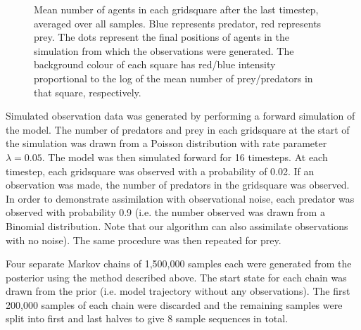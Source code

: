\documentclass{article}
\begin{document}
\begin{figure}
	\centering
	\caption{Mean number of agents in each gridsquare after the last timestep, averaged over all samples. Blue represents predator, red represents prey. The dots represent the final positions of agents in the simulation from which the observations were generated. The background colour of each square has red/blue intensity proportional to the log of the mean number of prey/predators in that square, respectively.}
	\label{figEndState}
\end{figure}


Simulated observation data was generated by performing a forward simulation of the model. The number of predators and prey in each gridsquare at the start of the simulation was drawn from a Poisson distribution with rate parameter $\lambda = 0.05$. The model was then simulated forward for 16 timesteps. At each timestep, each gridsquare was observed with a probability of 0.02. If an observation was made, the number of predators in the gridsquare was observed. In order to demonstrate assimilation with observational noise, each predator was observed with probability 0.9 (i.e. the number observed was drawn from a Binomial distribution. Note that our algorithm can also assimilate observations with no noise). The same procedure was then repeated for prey.

Four separate Markov chains of 1,500,000 samples each were generated from the posterior using the method described above. The start state for each chain was drawn from the prior (i.e. model trajectory without any observations). The first 200,000 samples of each chain were discarded and the remaining samples were split into first and last halves to give 8 sample sequences in total. 
\end{document}
